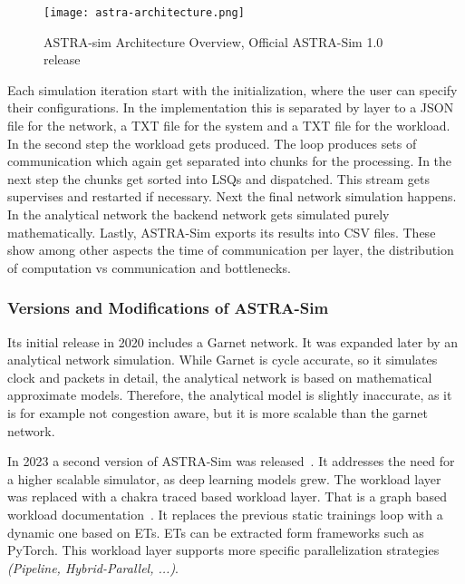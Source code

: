 \begin{figure}[H]
    \centering
    \texttt{[image: astra-architecture.png]}
    \caption{ASTRA-sim Architecture Overview, Official ASTRA-Sim 1.0 release~\cite{rashidi_astra-sim_2020}}
  \label{fig:astra-architecture}
\end{figure}

Each simulation iteration start with the initialization, where the user can specify their configurations. In the implementation this is separated by layer to a \ac{JSON} file for the network, a \ac{TXT} file for the system and a \ac{TXT} file for the workload. 
In the second step the workload gets produced. The loop produces sets of communication which again get separated into chunks for the processing.
In the next step the chunks get sorted into \acp{LSQ} and dispatched. This stream gets supervises and restarted if necessary. 
Next the final network simulation happens. In the analytical network the backend network gets simulated purely mathematically.
Lastly, \ac{ASTRA-Sim} exports its results into \ac{CSV} files. These show among other aspects the time of communication per layer, the distribution of computation vs communication and bottlenecks.


\subsubsection*{Versions and Modifications of ASTRA-Sim}
\label{sec:comparison}
Its initial release in 2020 includes a Garnet network. It was expanded later by an analytical network simulation. While Garnet is cycle accurate, so it simulates clock and packets in detail, the analytical network is based on mathematical approximate models. Therefore, the analytical model is slightly inaccurate, as it is for example not congestion aware, but it is more scalable than the garnet network.

In 2023 a second version of \ac{ASTRA-Sim} was released~\cite{won_astra-sim20_2023}. It addresses the need for a higher scalable simulator, as deep learning models grew. 
The workload layer was replaced with a chakra traced based workload layer. That is a graph based workload documentation~\cite{sridharan_chakra_2023}. %
It replaces the previous static trainings loop with a dynamic one based on \acp{ET}. \acp{ET} can be extracted form frameworks such as PyTorch. This workload layer supports more specific parallelization strategies \textit{(Pipeline, Hybrid-Parallel, ...)}. %

